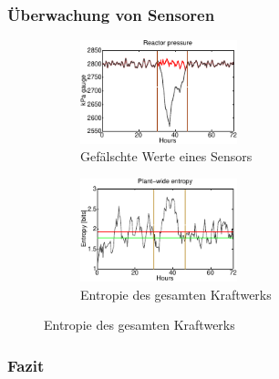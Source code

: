 \documentclass{sikslides}
\begin{document}
    \begin{frame}
        \frametitle{Überwachung von Sensoren}
        \begin{figure}
            \centering
            \begin{subfigure}{0.49\textwidth}
                \includegraphics[height=3cm]{../figure/entropy_a}
                \caption{Gefälschte Werte eines Sensors}
            \end{subfigure}
            \begin{subfigure}{0.49\textwidth}
                \includegraphics[height=3cm]{../figure/entropy_b}
                \caption{Entropie des gesamten Kraftwerks}
            \end{subfigure}
        \end{figure}
    \end{frame}

    \begin{frame}
        \frametitle{Fazit}

    \end{frame}
\end{document}
